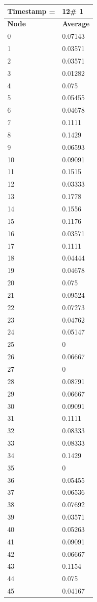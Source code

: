 \begin{tabular}{|l||l|}
\hline
\textbf{Timestamp =} & \textbf{12}\# 1\\\hline
	\textbf{Node} & \textbf{Average} \\ \hline
\hline
	0 & 0.07143 \\ \hline
	1 & 0.03571 \\ \hline
	2 & 0.03571 \\ \hline
	3 & 0.01282 \\ \hline
	4 & 0.075 \\ \hline
	5 & 0.05455 \\ \hline
	6 & 0.04678 \\ \hline
	7 & 0.1111 \\ \hline
	8 & 0.1429 \\ \hline
	9 & 0.06593 \\ \hline
	10 & 0.09091 \\ \hline
	11 & 0.1515 \\ \hline
	12 & 0.03333 \\ \hline
	13 & 0.1778 \\ \hline
	14 & 0.1556 \\ \hline
	15 & 0.1176 \\ \hline
	16 & 0.03571 \\ \hline
	17 & 0.1111 \\ \hline
	18 & 0.04444 \\ \hline
	19 & 0.04678 \\ \hline
	20 & 0.075 \\ \hline
	21 & 0.09524 \\ \hline
	22 & 0.07273 \\ \hline
	23 & 0.04762 \\ \hline
	24 & 0.05147 \\ \hline
	25 & 0 \\ \hline
	26 & 0.06667 \\ \hline
	27 & 0 \\ \hline
	28 & 0.08791 \\ \hline
	29 & 0.06667 \\ \hline
	30 & 0.09091 \\ \hline
	31 & 0.1111 \\ \hline
	32 & 0.08333 \\ \hline
	33 & 0.08333 \\ \hline
	34 & 0.1429 \\ \hline
	35 & 0 \\ \hline
	36 & 0.05455 \\ \hline
	37 & 0.06536 \\ \hline
	38 & 0.07692 \\ \hline
	39 & 0.03571 \\ \hline
	40 & 0.05263 \\ \hline
	41 & 0.09091 \\ \hline
	42 & 0.06667 \\ \hline
	43 & 0.1154 \\ \hline
	44 & 0.075 \\ \hline
	45 & 0.04167 \\ \hline
\end{tabular}
